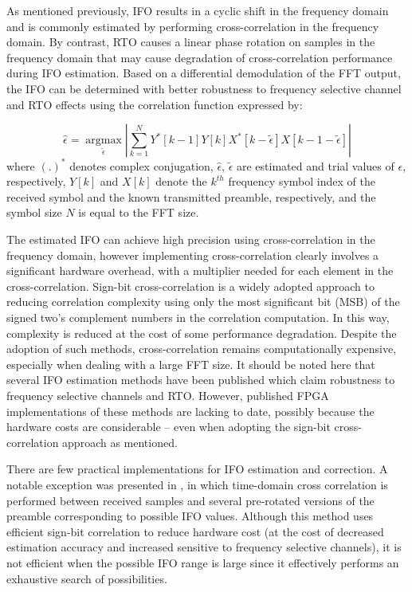 As mentioned previously, IFO results in a cyclic shift in the frequency domain and is commonly estimated by performing cross-correlation in the frequency domain.
By contrast, RTO causes a linear phase rotation on samples in the frequency domain that may cause degradation of cross-correlation performance during IFO estimation.
Based on a differential demodulation of the FFT output, the IFO can be determined with better robustness to frequency selective channel and RTO effects using the correlation function \cite{Park2002} expressed by:

\begin{equation}
\label{integerCFO}
\hat{\epsilon} =\underset{\tilde{\epsilon}}{\operatorname{argmax}}  \left|\sum_{k=1}^{N} Y^{*}[k-1] Y[k]  X^{*}[k-\tilde{\epsilon}]  X[k-1-\tilde{\epsilon}]\right|
\end{equation}
where $(.)^{*}$ denotes complex conjugation, $\hat{\epsilon}$, $\tilde{\epsilon}$ are estimated and trial values of $\epsilon$, respectively,
$Y[k]$ and $X[k]$ denote the $k^{th}$ frequency symbol index of the received symbol and the known transmitted preamble, respectively, and the symbol size $N$ is equal to the FFT size.

The estimated IFO can achieve high precision using cross-correlation in the frequency domain, however implementing cross-correlation clearly involves a significant hardware overhead, with a multiplier needed for each element in the cross-correlation.
Sign-bit cross-correlation \cite{Schwoerer2002} is a widely adopted approach to reducing correlation complexity using only the most significant bit (MSB) of the signed two's complement numbers in the correlation computation. In this way, complexity is reduced at the cost of some performance degradation.
Despite the adoption of such methods, cross-correlation remains computationally expensive, especially when dealing with a large FFT size.
It should be noted here that several IFO estimation methods have been published which claim robustness to frequency selective channels and RTO. However, published FPGA implementations of these methods are lacking to date, possibly because the hardware costs are considerable -- even when adopting the sign-bit cross-correlation approach as mentioned.%

There are few practical implementations for IFO estimation and correction. 
A notable exception was presented in \cite{Kim2008}, in which time-domain cross correlation is performed between received samples and several pre-rotated versions of the preamble corresponding to possible IFO values. Although this method uses efficient sign-bit correlation to reduce hardware cost (at the cost of decreased estimation accuracy and increased sensitive to frequency
selective channels), it is not efficient when the possible IFO range is large since it effectively performs an exhaustive search of possibilities.

